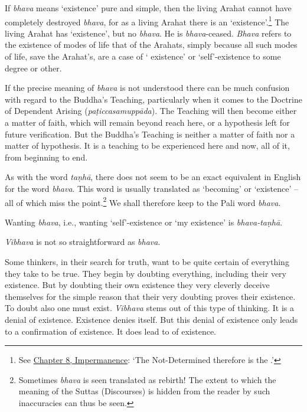 If \emph{bhava} means `existence' pure and simple, then the living Arahat cannot have completely destroyed \emph{bhava}, for as a living Arahat there is an `existence'.\footnote{See \href{ch-08-impermanence.xml\#living-experience}{Chapter 8, Impermanence}: `The Not-Determined therefore is the .'} The living Arahat has `existence', but no \emph{bhava}. He is \emph{bhava}-ceased. \emph{Bhava} refers to the existence of  modes of life  that of the Arahats, simply because all such modes of life, save the Arahat's, are a case of ` existence' or `self'-existence to some degree or other.

If the precise meaning of \emph{bhava} is not understood there can be much confusion with regard to the Buddha's Teaching, particularly when it comes to the Doctrine of Dependent Arising (\emph{paṭiccasamuppāda}). The Teaching will then become either a matter of faith, which will remain beyond reach here, or a hypothesis left for future verification. But the Buddha's Teaching is neither a matter of faith nor a matter of hypothesis. It is a teaching to be experienced here and now, all of it, from beginning to end.

As with the word \emph{taṇhā}, there does not seem to be an exact equivalent in English for the word \emph{bhava}. This word is usually translated as `becoming' or `existence' -- all of which miss the point.\footnote{Sometimes \emph{bhava} is seen translated as rebirth! The extent to which the meaning of the Suttas (Discourses) is hidden from the reader by such inaccuracies can thus be seen.} We shall therefore keep to the Pali word \emph{bhava}.

Wanting \emph{bhava}, i.e., wanting `self'-existence or `my existence' is \emph{bhava-taṇhā}.

\emph{Vibhava} is not so straightforward as \emph{bhava}.

Some thinkers, in their search for truth, want to be quite certain of everything they take to be true. They begin by doubting everything, including their very existence. But by doubting their own existence they very cleverly deceive themselves for the simple reason that their very doubting proves their existence. To doubt also one must exist. \emph{Vibhava} stems out of this type of thinking. It is a denial of existence. Existence denies itself. But this denial of existence only leads to a confirmation of existence. It does  lead to  of existence.


